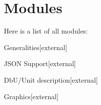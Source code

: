 \section{Modules}
Here is a list of all modules\+:\begin{DoxyCompactList}
\item {}
\item {}
\item Generalities{\ttfamily  \mbox{[}external\mbox{]}}\item J\+S\+ON Support{\ttfamily  \mbox{[}external\mbox{]}}\item Db\+U/\+Unit description{\ttfamily  \mbox{[}external\mbox{]}}\item Graphics{\ttfamily  \mbox{[}external\mbox{]}}\end{DoxyCompactList}
